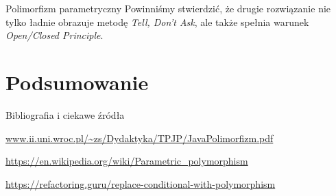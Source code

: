 \begin{frame}{Polimorfizm parametryczny}
	Powinniśmy stwierdzić, że drugie rozwiązanie nie tylko ładnie obrazuje metodę \emph{Tell, Don't Ask}, ale także spełnia warunek \emph{Open/Closed Principle}. 
\end{frame}

\section{Podsumowanie}

\begin{frame}{Bibliografia i ciekawe źródła}
  
	\begin{thebibliography}{9}
		
		\url{www.ii.uni.wroc.pl/~zs/Dydaktyka/TPJP/JavaPolimorfizm.pdf}
		
		\url{https://en.wikipedia.org/wiki/Parametric_polymorphism}
		
		\url{https://refactoring.guru/replace-conditional-with-polymorphism}
		
	\end{thebibliography}

\end{frame}


